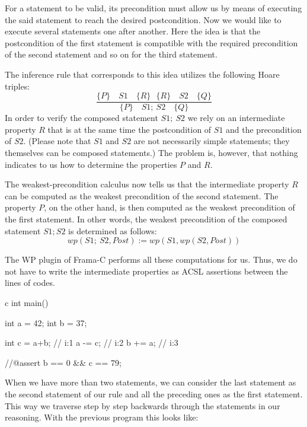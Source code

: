 
For a statement to be valid, its precondition must allow us by means of
executing the said statement to reach the desired postcondition. Now we
would like to execute several statements one after another. Here the
idea is that the postcondition of the first statement is compatible with
the required precondition of the second statement and so on for the
third statement.



The inference rule that corresponds to this idea utilizes the following
Hoare triples:
$$\dfrac{\{P\}\quad S1 \quad \{R\} \ \ \ \{R\}\quad S2 \quad \{Q\}}{\{P\}\quad S1 ;\ S2 \quad \{Q\}}$$
In order to verify the composed statement $S1;\ S2$ we rely on an
intermediate property $R$ that is at the same time the postcondition
of $S1$ and the precondition of $S2$. (Please note that $S1$ and
$S2$ are not necessarily simple statements; they themselves can be
composed statements.) The problem is, however, that nothing indicates to us
how to determine the properties $P$ and $R$.

The weakest-precondition calculus now tells us that the intermediate
property $R$ can be computed as the weakest precondition of the second
statement. The property $P$, on the other hand, is then computed as
the weakest precondition of the first statement. In other words, the
weakest precondition of the composed statement $S1; S2$ is determined
as follows:
$$wp(S1;\ S2 , Post) := wp(S1, wp(S2, Post) )$$


The WP plugin of Frama-C performs all these computations for us. Thus,
we do not have to write the intermediate properties as ACSL assertions
between the lines of codes.



\begin{CodeBlock}{c}
int main(){
  int a = 42;
  int b = 37;

  int c = a+b; // i:1
  a -= c;      // i:2
  b += a;      // i:3

  //@assert b == 0 && c == 79;
}
\end{CodeBlock}





When we have more than two statements, we can consider the last
statement as the second statement of our rule and all the preceding ones as
the first statement. This way we traverse step by step backwards through the
statements in our reasoning. With the previous program this looks like:



